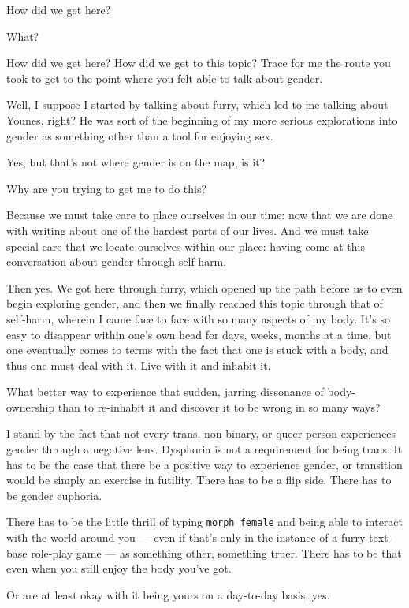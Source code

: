 \begin{ally}
How did we get here?
\end{ally}
What?

\begin{ally}
How did we get here? How did we get to this topic? Trace for me the route you took to get to the point where you felt able to talk about gender.
\end{ally}
Well, I suppose I started by talking about furry, which led to me talking about Younes, right? He was sort of the beginning of my more serious explorations into gender as something other than a tool for enjoying sex.

\begin{ally}
Yes, but that's not where gender is on the map, is it?
\end{ally}
Why are you trying to get me to do this?

\begin{ally}
Because we must take care to place ourselves in our time: now that we are done with writing about one of the hardest parts of our lives. And we must take special care that we locate ourselves within our place: having come at this conversation about gender through self-harm.
\end{ally}
Then yes. We got here through furry, which opened up the path before us to even begin exploring gender, and then we finally reached this topic through that of self-harm, wherein I came face to face with so many aspects of my body. It's so easy to disappear within one's own head for days, weeks, months at a time, but one eventually comes to terms with the fact that one is stuck with a body, and thus one must deal with it. Live with it and inhabit it.

What better way to experience that sudden, jarring dissonance of body-ownership than to re-inhabit it and discover it to be wrong in so many ways?
\newpage

I stand by the fact that not every trans, non-binary, or queer person experiences gender through a negative lens. Dysphoria is not a requirement for being trans. It has to be the case that there be a positive way to experience gender, or transition would be simply an exercise in futility. There has to be a flip side. There has to be gender euphoria.

\begin{ally}
There has to be the little thrill of typing \texttt{morph\ female} and being able to interact with the world around you --- even if that's only in the instance of a furry text-base role-play game --- as something other, something truer. There has to be that even when you still enjoy the body you've got.
\end{ally}
Or are at least okay with it being yours on a day-to-day basis, yes.

